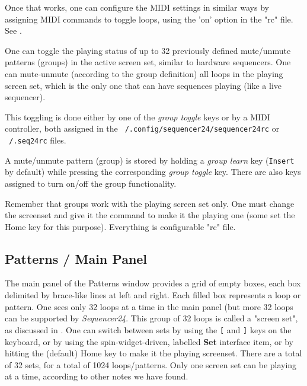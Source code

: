    Once that works, one can configure the MIDI settings in similar ways
   by assigning MIDI commands to toggle loops, using 
   the 'on' option in the "rc" file.
   See .

	One can toggle the playing status of up to 32 previously
	defined mute/unmute patterns (groups) in the active screen
	set, similar to hardware sequencers.
   One can mute-unmute (according to the group definition) all loops in the
   playing screen set, which is the only one that can have sequences playing
   (like a live sequencer).

	This toggling is done either by one of the \textsl{group toggle} keys
	or by a MIDI controller, both assigned in the
   \texttt{~/.config/sequencer24/sequencer24rc} or \texttt{~/.seq24rc} files.

	A mute/unmute pattern (group) is stored by holding a
   \textsl{group learn} key (\texttt{Insert} by default) while pressing the
   corresponding \textsl{group toggle} key.
	There are also keys assigned to turn on/off the group functionality.

   Remember that groups work with the playing screen set only.
   One must change the screenset and give it the command to make it the
   playing one
   (some set the Home key for this purpose).
   Everything is configurable "rc" file.

\subsection{Patterns / Main Panel}
\label{subsec:seq24_patterns_panel_main}

   The main panel of the Patterns window provides a grid of empty boxes,
   each box delimited by brace-like lines at left and right.
   Each filled box represents a loop or pattern.
   One sees only 32 loops at a time in the main panel (but more 32
   loops can be supported by \textsl{Sequencer24}.
   This group of 32 loops is called a "screen set", as discussed in
   .
   One can switch between sets by using the
   \index{keys![}
   \texttt{[} and
   \index{keys!]}
   \texttt{]} keys on the keyboard, or by using
   the spin-widget-driven, labelled \textbf{Set} interface item, or
   by hitting the (default) Home key to make it the playing screenset.
   There are a total of 32 sets, for a total of 1024 loops/patterns. 
   Only one screen set can be playing at a time, according to other notes we
   have found.

